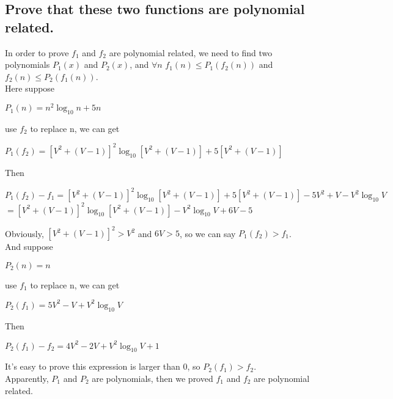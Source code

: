 \documentclass[12pt, a4paper]{report}
\begin{document}
\subsection{Prove that these two functions are polynomial related.}
In order to prove $f_{1}$ and $f_{2}$ are polynomial related, we need to find two polynomials $P_{1}(x)$ and $P_{2}(x)$, and $\forall n$ $f_{1}(n) \leq P_{1}(f_{2}(n))$ and $f_{2}(n) \leq P_{2}(f_{1}(n))$. \\
Here suppose 
\begin{center}
$P_{1}(n) = n^{2} \log_{10} n + 5n$
\end{center}
use $f_{2}$ to replace n, we can get \\
\begin{center}
$P_{1}(f_{2}) = [V^{2} + (V-1)]^{2} \log_{10} [V^{2} + (V-1)] + 5 [V^{2} + (V-1)]$
\end{center}
Then
\begin{center}
$P_{1}(f_{2}) - f_{1} = [V^{2} + (V-1)]^{2} \log_{10} [V^{2} + (V-1)] + 5 [V^{2} + (V-1)] - 5V^{2} + V - V^{2} \log_{10} V$ \\
$= [V^{2} + (V-1)]^{2} \log_{10} [V^{2} + (V-1)] - V^{2} \log_{10} V + 6V - 5$ \\
\end{center}
Obviously, $[V^{2} + (V-1)]^{2} > V^{2}$ and $6V > 5$, so we can say $P_{1}(f_{2}) > f_{1}$. \\
And suppose 
\begin{center}
$P_{2}(n) = n$
\end{center}
use $f_{1}$ to replace n, we can get \\
\begin{center}
$P_{2}(f_{1}) = 5V^{2} - V + V^{2} \log_{10} V$
\end{center}
Then
\begin{center}
$P_{2}(f_{1}) - f_{2} = 4V^{2} - 2V + V^{2} \log_{10} V + 1$
\end{center}
It's easy to prove this expression is larger than 0, so $P_{2}(f_{1}) > f_{2}$. \\
Apparently, $P_{1}$ and $P_{2}$ are polynomials, then we proved $f_{1}$ and $f_{2}$ are polynomial related.
\end{document}
